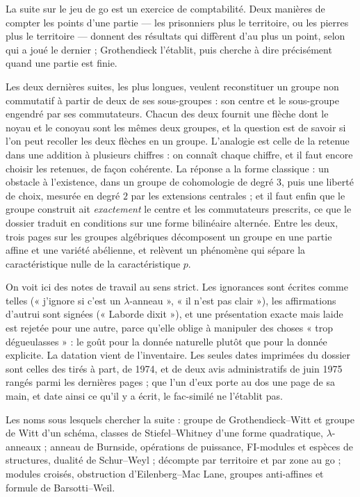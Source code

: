 \documentclass[11pt,a4paper]{article}
\begin{document}
\begin{resume}
La suite sur le jeu de go est un exercice de comptabilité. Deux manières de
compter les points d'une partie — les prisonniers plus le territoire, ou les
pierres plus le territoire — donnent des résultats qui diffèrent d'au plus
un point, selon qui a joué le dernier ; Grothendieck l'établit, puis cherche
à dire précisément quand une partie est finie.

Les deux dernières suites, les plus longues, veulent reconstituer un groupe
non commutatif à partir de deux de ses sous-groupes : son centre et le
sous-groupe engendré par ses commutateurs. Chacun des deux fournit une
flèche dont le noyau et le conoyau sont les mêmes deux groupes, et la
question est de savoir si l'on peut recoller les deux flèches en un groupe.
L'analogie est celle de la retenue dans une addition à plusieurs chiffres :
on connaît chaque chiffre, et il faut encore choisir les retenues, de façon
cohérente. La réponse a la forme classique : un obstacle à l'existence,
dans un groupe de cohomologie de degré $3$, puis une liberté de choix,
mesurée en degré $2$ par les extensions centrales ; et il faut enfin que le
groupe construit ait \emph{exactement} le centre et les commutateurs
prescrits, ce que le dossier traduit en conditions sur une forme bilinéaire
alternée. Entre les deux, trois pages sur les groupes algébriques
décomposent un groupe en une partie affine et une variété abélienne, et
relèvent un phénomène qui sépare la caractéristique nulle de la
caractéristique $p$.

On voit ici des notes de travail au sens strict. Les ignorances sont écrites
comme telles (« j'ignore si c'est un $\lambda$-anneau », « il n'est pas
clair »), les affirmations d'autrui sont signées (« Laborde dixit »), et une
présentation exacte mais laide est rejetée pour une autre, parce qu'elle
oblige à manipuler des choses « trop dégueulasses » : le goût pour la donnée
naturelle plutôt que pour la donnée explicite. La datation vient de
l'inventaire. Les seules dates imprimées du dossier sont celles des tirés à
part, de 1974, et de deux avis administratifs de juin 1975 rangés parmi les
dernières pages ; que l'un d'eux porte au dos une page de sa main, et date
ainsi ce qu'il y a écrit, le fac-similé ne l'établit pas.

Les noms sous lesquels chercher la suite : groupe de Grothendieck–Witt et
groupe de Witt d'un schéma, classes de Stiefel–Whitney d'une forme
quadratique, $\lambda$-anneaux ; anneau de Burnside, opérations de
puissance, FI-modules et espèces de structures, dualité de Schur–Weyl ;
décompte par territoire et par zone au go ; modules croisés, obstruction
d'Eilenberg–Mac Lane, groupes anti-affines et formule de Barsotti–Weil.


\end{resume}
\end{document}
